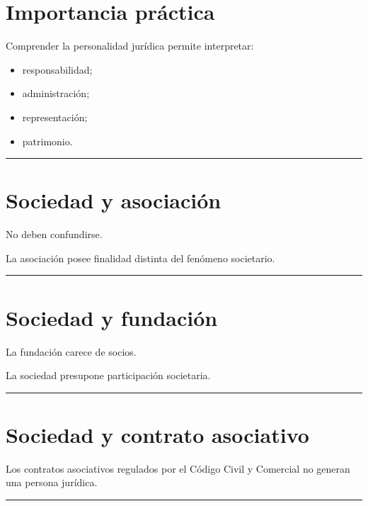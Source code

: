 \documentclass[
  spanish,
  letterpaper,
  DIV=11,
  numbers=noendperiod]{scrartcl}
\providecommand{\tightlist}{%
  \setlength{\itemsep}{0pt}\setlength{\parskip}{0pt}}
\begin{document}
\section{Importancia práctica}\label{importancia-pruxe1ctica-1}

Comprender la personalidad jurídica permite interpretar:

\begin{itemize}
\tightlist
\item
  responsabilidad;
\item
  administración;
\item
  representación;
\item
  patrimonio.
\end{itemize}

\begin{center}\rule{0.5\linewidth}{0.5pt}\end{center}

\section{Sociedad y asociación}\label{sociedad-y-asociaciuxf3n}

No deben confundirse.

La asociación posee finalidad distinta del fenómeno societario.

\begin{center}\rule{0.5\linewidth}{0.5pt}\end{center}

\section{Sociedad y fundación}\label{sociedad-y-fundaciuxf3n}

La fundación carece de socios.

La sociedad presupone participación societaria.

\begin{center}\rule{0.5\linewidth}{0.5pt}\end{center}

\section{Sociedad y contrato
asociativo}\label{sociedad-y-contrato-asociativo}

Los contratos asociativos regulados por el Código Civil y Comercial no
generan una persona jurídica.

\begin{center}\rule{0.5\linewidth}{0.5pt}\end{center}
\end{document}
